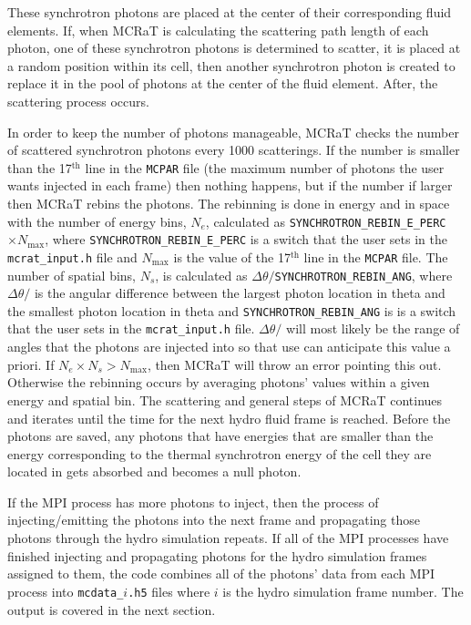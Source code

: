 \documentclass[12pt,a4paper]{article}
\begin{document}
These synchrotron photons are placed at the center of their corresponding fluid elements. If, when MCRaT is calculating the scattering path length of each photon, one of these synchrotron photons is determined to scatter, it is placed at a random position within its cell, then another synchrotron photon is created to replace it in the pool of photons at the center of the fluid element. After, the scattering process occurs.

In order to keep the number of photons manageable, MCRaT checks the number of scattered synchrotron photons every 1000 scatterings. If the number is smaller than the 17$^\textrm{th}$ line in the \texttt{MCPAR} file (the maximum number of photons the user wants injected in each frame) then nothing happens, but if the number if larger then MCRaT rebins the photons. The rebinning is done in energy and in space with the number of energy bins, $N_e$, calculated as \texttt{SYNCHROTRON\_REBIN\_E\_PERC}$\times N_\mathrm{max}$, where \texttt{SYNCHROTRON\_REBIN\_E\_PERC} is a switch that the user sets in the \texttt{mcrat\_input.h} file and $N_\mathrm{max}$ is the value of the 17$^\textrm{th}$ line in the \texttt{MCPAR} file. The number of spatial bins, $N_s$, is calculated as $\Delta \theta/$\texttt{SYNCHROTRON\_REBIN\_ANG}, where $\Delta \theta/$ is the angular difference between the largest photon location in theta and the smallest photon location in theta and \texttt{SYNCHROTRON\_REBIN\_ANG} is is a switch that the user sets in the \texttt{mcrat\_input.h} file. $\Delta \theta/$ will most likely be the range of angles that the photons are injected into so that use can anticipate this value a priori. If $N_e\times N_s>N_\mathrm{max}$, then MCRaT will throw an error pointing this out. Otherwise the rebinning occurs by averaging photons' values within a given energy and spatial bin. The scattering and general steps of MCRaT continues and iterates until the time for the next hydro fluid frame is reached. Before the photons are saved, any photons that have energies that are smaller than the energy corresponding to the thermal synchrotron energy of the cell they are located in gets absorbed and becomes a null photon. 

If the MPI process has more photons to inject, then the process of injecting/emitting the photons into the next frame and propagating those photons through the hydro simulation repeats. If all of the MPI processes have finished injecting and propagating photons for the hydro simulation frames assigned to them, the code combines all of the photons' data from each MPI process into \texttt{mcdata\_$i$.h5} files where $i$ is the hydro simulation frame number. The output is covered in the next section.
\end{document}
